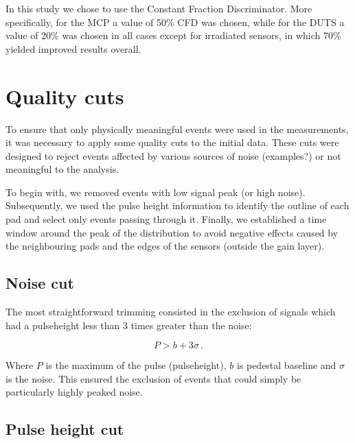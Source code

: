 In this study we chose to use the Constant Fraction Discriminator. More specifically, for the MCP a value of 50\% CFD was chosen, while for the DUTS a value of 20\% was chosen in all cases except for irradiated sensors, in which 70\% yielded improved results overall.


\section{Quality cuts}\label{sec:qualtiy_cuts}

To ensure that only physically meaningful events were used in the measurements, it was necessary to apply some quality cuts to the initial data. These cuts were designed to reject events affected by various sources of noise (examples?) or not meaningful to the analysis. 

To begin with, we removed events with low signal peak (or high noise). Subsequently, we used the pulse height information to identify the outline of each pad and select only events passing through it. Finally, we established a time window around the peak of the distribution to avoid negative effects caused by the neighbouring pads and the edges of the sensors (outside the gain layer).


\subsection{Noise cut}\label{subsec:noise_cut}
The most straightforward trimming consisted in the exclusion of signals which had a pulseheight less than 3 times greater than the noise:

\begin{equation*}
    P > b + 3\sigma \, .
\end{equation*}

Where $P$ is the maximum of the pulse (pulseheight), $b$ is pedestal baseline and $\sigma$ is the noise. This ensured the exclusion of events that could simply be particularly highly peaked noise. %

\subsection{Pulse height cut}\label{subsec:pulseHeight_cut}


